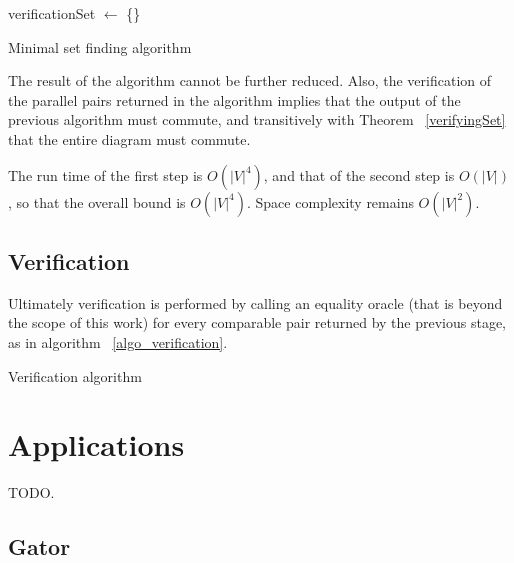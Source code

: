 \documentclass[sigplan,review,anonymous]{acmart}
\begin{document}
{\begin{algorithm}
verificationSet $\gets$ \{\}\;
\;
\caption{Minimal set finding algorithm}
\label{algo_online_minimal}
\end{algorithm}

The result of the algorithm cannot be further reduced.
Also, the verification of the parallel pairs returned in the algorithm implies that the output of the previous algorithm must commute, and transitively with Theorem ~\ref{verifyingSet} that the entire diagram must commute.

The run time of the first step is $O(|V|^4)$, and that of the second step is $O(|V|)$, so that the overall bound is $O(|V|^4)$.
Space complexity remains $O(|V|^2)$.

\subsection{Verification}
Ultimately verification is performed by calling an equality oracle (that is beyond the scope of this work) for every comparable pair returned by the previous stage, as in algorithm ~\ref{algo_verification}.

\begin{algorithm}
\DontPrintSemicolon
{}
\;
\caption{Verification algorithm}\label{algo_verification}
\end{algorithm}

\section{Applications}
TODO.

\subsection{Gator}

}
\end{document}
